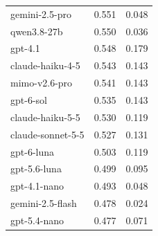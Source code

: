 \begin{table}
\begin{tabular}{lrr}
gemini-2.5-pro & 0.551 & 0.048 \\
qwen3.8-27b & 0.550 & 0.036 \\
gpt-4.1 & 0.548 & 0.179 \\
claude-haiku-4-5 & 0.543 & 0.143 \\
mimo-v2.6-pro & 0.541 & 0.143 \\
gpt-6-sol & 0.535 & 0.143 \\
claude-haiku-5-5 & 0.530 & 0.119 \\
claude-sonnet-5-5 & 0.527 & 0.131 \\
gpt-6-luna & 0.503 & 0.119 \\
gpt-5.6-luna & 0.499 & 0.095 \\
gpt-4.1-nano & 0.493 & 0.048 \\
gemini-2.5-flash & 0.478 & 0.024 \\
gpt-5.4-nano & 0.477 & 0.071 \\
\bottomrule
\end{tabular}
\end{table}
